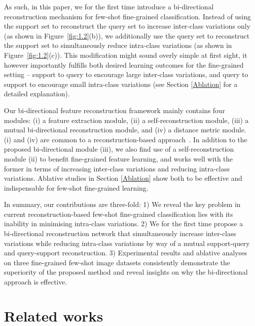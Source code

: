 \documentclass[letterpaper]{article} %
\begin{document}
As such, in this paper, we for the first time introduce a bi-directional reconstruction mechanism for few-shot fine-grained classification. Instead of using the support set to reconstruct the query set to increase inter-class variations only (as shown in Figure~\ref{fig:1.2}(b)), 
we additionally use the query set to reconstruct the support set to simultaneously reduce intra-class variations (as shown in Figure~\ref{fig:1.2}(c)). This modification might sound overly simple at first sight, it however importantly fulfills both desired learning outcomes for the fine-grained setting -- support to query to encourage large inter-class variations, and query to support to encourage small intra-class variations
(see Section \ref{Ablation} for a detailed explanation). 


Our bi-directional feature reconstruction framework mainly contains four modules: (i) a feature extraction module, (ii) a self-reconstruction module, (iii) a mutual bi-directional reconstruction module, and (iv) a distance metric module. (i) and (iv) are common to a reconstruction-based approach~\cite{Wertheimer_2021_CVPR}. In addition to the proposed bi-directional module (iii), we also find use of a self-reconstruction module (ii) to benefit fine-grained feature learning, and works well with the former in terms of increasing inter-class variations and reducing intra-class variations. Ablative studies in Section \ref{Ablation} show both to be effective {and indispensable} for few-shot fine-grained learning. 



In summary, our contributions are three-fold: 
1) We reveal the key problem in current reconstruction-based few-shot fine-grained classification lies with its inability in minimising intra-class variations. 
2) We for the first time propose a bi-directional reconstruction network that simultaneously increase inter-class variations while reducing intra-class variations by way of a mutual {support-query and query-support} reconstruction. 
3) Experimental results and ablative analyses on three fine-grained few-shot image datasets consistently demonstrate the superiority of the proposed method and reveal insights on why the bi-directional approach is effective. 




\section{Related works}
\end{document}
